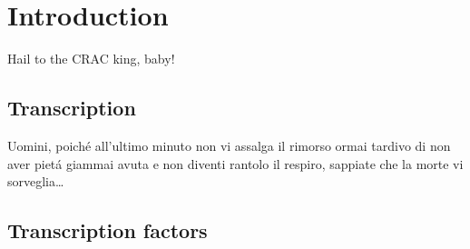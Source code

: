 \documentclass{Thesis}
\begin{document}
\listoftodos
\frontmatter

\part{Introduction}

\begin{savequote}[70mm]
Hail to the CRAC king, baby!
\end{savequote}

\chapter{Transcription}


	
	
	
	

\begin{savequote}[70mm]
Uomini, poich\'{e} all'ultimo minuto non vi assalga il rimorso ormai tardivo di non aver piet\'{a} giammai avuta e non diventi rantolo il respiro, sappiate che la morte vi sorveglia\ldots
{} 
\end{savequote}

\chapter{Transcription factors}


	
	
	


%
%
%



\singlespacing


\end{document}
